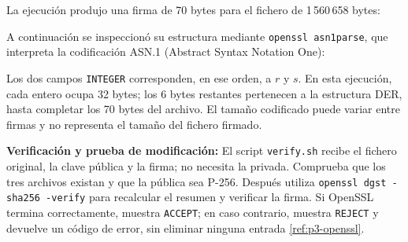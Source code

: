 \begingroup
\renewcommand{\lstlistingname}{Script}

\endgroup

La ejecución produjo una firma de 70 bytes para el fichero de 1\,560\,658 bytes:

\noindent\begin{minipage}{\linewidth}
\begingroup
\renewcommand{\lstlistingname}{Salida y verificación}

\endgroup
\end{minipage}

A continuación se inspeccionó su estructura mediante \texttt{openssl asn1parse}, que interpreta la codificación ASN.1 (Abstract Syntax Notation One):

\noindent\begin{minipage}{\linewidth}
\begingroup
\renewcommand{\lstlistingname}{Salida y verificación}

\endgroup
\end{minipage}

Los dos campos \texttt{INTEGER} corresponden, en ese orden, a $r$ y $s$. En esta ejecución, cada entero ocupa 32 bytes; los 6 bytes restantes pertenecen a la estructura DER, hasta completar los 70 bytes del archivo. El tamaño codificado puede variar entre firmas y no representa el tamaño del fichero firmado.

\textbf{Verificación y prueba de modificación:} El script \texttt{verify.sh} recibe el fichero original, la clave pública y la firma; no necesita la privada.
Comprueba que los tres archivos existan y que la pública sea P-256. Después utiliza \texttt{openssl dgst -sha256 -verify} para recalcular el resumen y verificar la firma.
Si OpenSSL termina correctamente, muestra \texttt{ACCEPT}; en caso contrario, muestra \texttt{REJECT} y devuelve un código de error, sin eliminar ninguna entrada \ref{ref:p3-openssl}.

\begingroup
\renewcommand{\lstlistingname}{Script}

\endgroup

